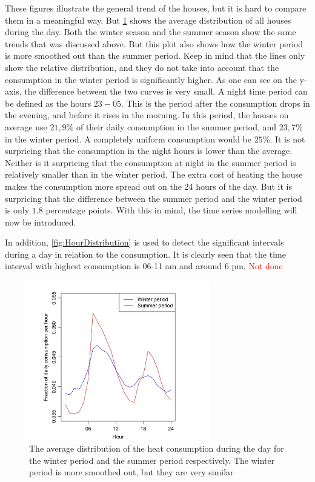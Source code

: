 \noindent These figures illustrate the general trend of the houses, but it is hard to compare them in a meaningful way. But \cref{fig: Season_dist} shows the average distribution of all houses during the day. Both the winter season and the summer season show the same trends that was discussed above. But this plot also shows how the winter period is more smoothed out than the summer period. Keep in mind that the lines only show the relative distribution, and they do not take into account that the consumption in the winter period is significantly higher. As one can see on the y-axis, the difference between the two curves is very small. A night time period can be defined as the hours $23-05$. This is the period after the consumption drops in the evening, and before it rises in the morning. In this period, the houses on average use $21,9\%$ of their daily consumption in the summer period, and $23,7\%$ in the winter period. A completely uniform consumption would be $25\%$. It is not surpricing that the consumption in the night hours is lower than the average. Neither is it surpricing that the consumption at night in the summer period is relatively smaller than in the winter period. The extra cost of heating the house makes the consumption more spread out on the 24 hours of the day. But it is surpricing that the difference between the summer period and the winter period is only $1.8$ percentage points. With this in mind, the time series modelling will now be introduced.

\noindent In addition, \cref{fig:HourDistribution} is used to detect the significant intervals during a day in relation to the consumption. It is clearly seen that the time interval with highest consumption is 06-11 am and around 6 pm. \textcolor{red}{Not done}

\begin{figure}
    \centering
    \includegraphics[width=0.7\textwidth]{../../../figures/Season_distribution.jpeg}
    \caption{The average distribution of the heat consumption during the day for the winter period and the summer period respectively. The winter period is more smoothed out, but they are very similar}
    \label{fig: Season_dist}
\end{figure}

